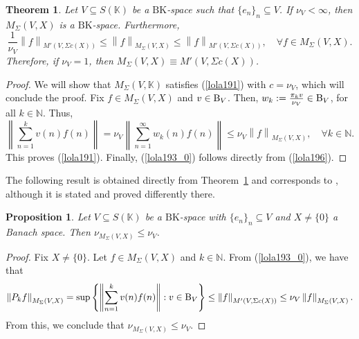 \documentclass[14pt, a4paper]{article}  %
\providecommand{\norm}[1]{\left\lVert#1\right\rVert}
\newcommand{\K}{\mathbb{K}}
\newcommand{\N}{\mathbb{N}}
\newcommand{\BK}{\text{BK}}
\newcommand{\B}{\textup{B}}
\newcommand{\Mt}{M'}
\newtheorem{proposition}{Proposition}[section]
\newtheorem{theorem}{Theorem}[section]
\begin{document}
 
\begin{theorem}\label{lola52_0} 
	Let $V \subseteq S(\K)$ be a $\BK$-space such that $\{e_{n}\}_{n} \subseteq V$. If $\nu_V < \infty$, then $M_{\Sigma}(V,X)$ is a $\BK$-space.
	Furthermore,  
	\begin{equation}\label{lola193_0} 
		\frac{1}{\nu_V} \norm{f}_{\Mt(V, \Sigma c(X))} \leq \norm{f}_{M_{\Sigma}(V,X)} \leq \norm{f}_{\Mt(V, \Sigma c(X))}, \quad \forall f \in M_{\Sigma}(V,X).
	\end{equation} 
	Therefore, if $\nu_V = 1$, then $M_{\Sigma}(V,X) \equiv \Mt(V, \Sigma c(X))$.
\end{theorem}  
 \begin{proof}
 	We will show that $M_{\Sigma}(V,\K)$ satisfies (\ref{lola191}) with $c = \nu_V$, which will conclude the proof. Fix $f \in M_{\Sigma}(V,X)$ and $v \in \B_V$. Then, $w_k := \frac{\pi_k v}{\nu_V} \in \B_V$, for all $k \in \N$. Thus, 
 	\begin{equation}
 		 \norm{\sum_{n=1}^{k} v(n) f(n)} = \nu_V \norm{\sum_{n=1}^{\infty} w_k(n) f(n)} \leq \nu_V \norm{f}_{M_{\Sigma}(V,X)}, \quad \forall k \in \N.
 	\end{equation}
 	This proves (\ref{lola191}). Finally, (\ref{lola193_0}) follows directly from (\ref{lola196}).
 \end{proof}


 
 

The following result is obtained directly from Theorem~\ref{lola52_0} and corresponds to \cite[Thm.~10.5.1]{Wil}, although it is stated and proved differently there.



\begin{proposition}\label{naty27}
	Let $V \subseteq S(\K)$ be a $\BK$-space with $\{e_n\}_{n} \subseteq V$ and $X \neq \{0\}$ a Banach space. Then $\nu_{M_{\Sigma}(V,X)} \leq \nu_V$.  
\end{proposition} 
\begin{proof}
	Fix $X \neq \{0\}$. Let $f \in M_{\Sigma}(V,X)$ and $k \in \N$. From (\ref{lola193_0}), we have that
	\begin{equation}
		\norm{P_k f}_{M_{\Sigma}(V,X)} = \sup \left\{ \norm{\sum_{n=1}^{k} v(n) f(n)} : v \in \B_V \right\} \leq \norm{f}_{M'(V,\Sigma c(X))} \leq \nu_V \norm{f}_{M_{\Sigma}(V,X)}.
	\end{equation}
	From this, we conclude that $\nu_{M_{\Sigma}(V,X)} \leq \nu_V$.
\end{proof}
 
\end{document}
